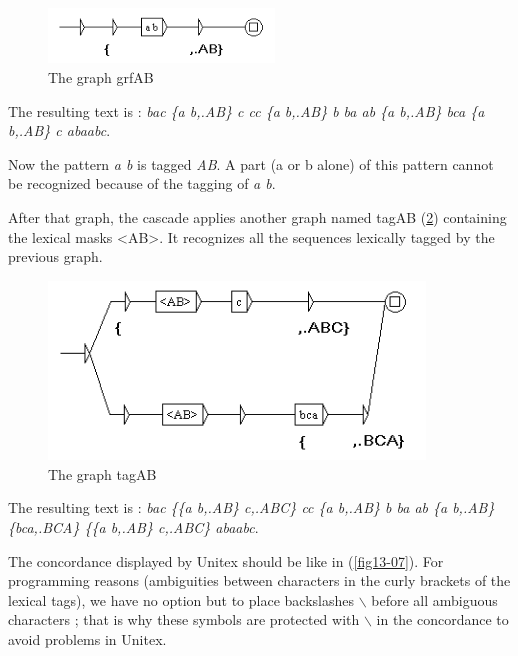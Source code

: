 \begin{figure}[!htb]
  \centering
  \includegraphics[width=6cm]{resources/img/fig13-05.png}
  \caption{The graph grfAB}
  \label{fig:fig13-05}
\end{figure}

\bigskip
\noindent The resulting text is : \emph{bac \{a b,.AB\} c cc \{a b,.AB\} b ba ab \{a b,.AB\} bca \{a b,.AB\} c abaabc}.

\bigskip
\noindent Now the pattern \emph{a b} is tagged \emph{AB}. A part (a or b alone) of this pattern cannot be recognized because of the tagging of \emph{a b}. 

\bigskip
\noindent After that graph, the cascade applies another graph named tagAB (\ref{fig13-06}) containing the lexical masks <AB>. It recognizes all the sequences lexically tagged by the previous graph.

\begin{figure}[!htb]
  \centering
  \includegraphics[width=10cm]{resources/img/fig13-06.png}
  \caption{The graph tagAB}
  \label{fig13-06}
\end{figure}

\bigskip
\noindent The resulting text is : \emph{bac \{\{a b,.AB\} c,.ABC\} cc \{a b,.AB\} b ba ab \{a b,.AB\} \{bca,.BCA\} \{\{a b,.AB\} c,.ABC\} abaabc}.


\bigskip
\noindent The concordance displayed by Unitex should be like in (\ref{fig13-07}). For programming reasons (ambiguities between characters in the curly brackets of the lexical tags), we have no option but to place backslashes $\backslash$ before all ambiguous characters ; that is why these symbols are protected with $\backslash$ in the concordance to avoid problems in Unitex. 

